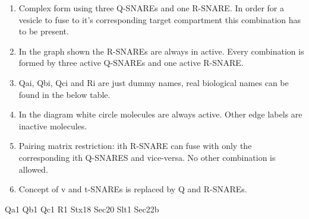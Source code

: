 \begin{enumerate}


\item Complex form using three Q-SNAREs and one R-SNARE. In order for a vesicle to fuse to it's corresponding target compartment this combination has to be present.
\item In the graph shown the R-SNAREs are always in active. Every combination is formed by three active Q-SNAREs and one active R-SNARE.
\item  Qai, Qbi, Qci and Ri are just dummy names, real biological names can be found in the below table. 
\item In the diagram white circle molecules are always active. Other edge labels are inactive molecules.
\item Pairing matrix restriction: ith R-SNARE can fuse with only the corresponding ith Q-SNARES and vice-versa. No other combination is allowed.
\item Concept of v and t-SNAREs is replaced by Q and R-SNAREs. 
\end{enumerate}



Qa1 Qb1 Qc1 R1
Stx18 Sec20 Slt1 Sec22b



